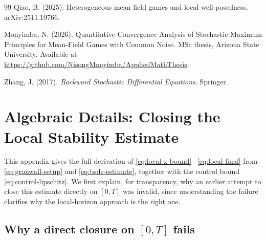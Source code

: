\documentclass[11pt]{article}
\theoremstyle{remark}
\begin{document}
\begin{thebibliography}{99}
Qiao, B. (2025).
\newblock Heterogeneous mean field games and local well-posedness.
\newblock arXiv:2511.19766.

Monyimba, N. (2026).
\newblock Quantitative Convergence Analysis of Stochastic Maximum Principles for
Mean-Field Games with Common Noise.
\newblock MSc thesis, Arizona State University.
\newblock Available at \url{https://github.com/NisongMonyimba/AppliedMathThesis}.

Zhang, J. (2017).
\newblock \emph{Backward Stochastic Differential Equations}.
\newblock Springer.

\end{thebibliography}

\appendix

\section{Algebraic Details: Closing the Local Stability Estimate}
\label{app:algebra}

This appendix gives the full derivation of \eqref{eq:local-x-bound}--%
\eqref{eq:local-final} from \eqref{eq:gronwall-setup} and \eqref{eq:bsde-estimate},
together with the control bound \eqref{eq:control-lipschitz}. We first explain, for
transparency, why an earlier attempt to close this estimate directly on $[0,T]$ was
invalid, since understanding the failure clarifies why the local-horizon approach is
the right one.

\subsection{Why a direct closure on $[0,T]$ fails}
\label{app:why-fails}
\end{document}
